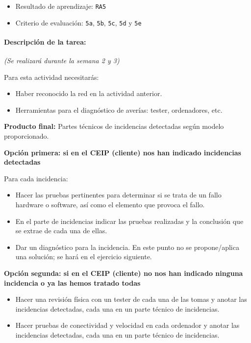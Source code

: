 \documentclass[
  spanish,
  11pt,
  paper=a4,
  ,captions=tableheading
]{scrartcl}
\providecommand{\tightlist}{%
  \setlength{\itemsep}{0pt}\setlength{\parskip}{0pt}}
\begin{document}
\begin{itemize}
\tightlist
\item
  Resultado de aprendizaje: \texttt{RA5}
\item
  Criterio de evaluación: \texttt{5a}, \texttt{5b}, \texttt{5c},
  \texttt{5d} y \texttt{5e}
\end{itemize}

\paragraph{Descripción de la tarea:}\label{descripciuxf3n-de-la-tarea-1}

\emph{(Se realizará durante la semana 2 y 3)}

Para esta actividad necesitarás:

\begin{itemize}
\tightlist
\item
  Haber reconocido la red en la actividad anterior.
\item
  Herramientas para el diagnóstico de averías: tester, ordenadores, etc.
\end{itemize}

\textbf{Producto final:} Partes técnicos de incidencias detectadas según
modelo proporcionado.

\textbf{Opción primera: si en el CEIP (cliente) nos han indicado
incidencias detectadas}

Para cada incidencia:

\begin{itemize}
\tightlist
\item
  Hacer las pruebas pertinentes para determinar si se trata de un fallo
  hardware o software, así como el elemento que provoca el fallo.
\item
  En el parte de incidencias indicar las pruebas realizadas y la
  conclusión que se extrae de cada una de ellas.
\item
  Dar un diagnóstico para la incidencia. En este punto no se
  propone/aplica una solución; se hará en el ejercicio siguiente.
\end{itemize}

\textbf{Opción segunda: si en el CEIP (cliente) no nos han indicado
ninguna incidencia o ya las hemos tratado todas}

\begin{itemize}
\tightlist
\item
  Hacer una revisión física con un tester de cada una de las tomas y
  anotar las incidencias detectadas, cada una en un parte técnico de
  incidencias.
\item
  Hacer pruebas de conectividad y velocidad en cada ordenador y anotar
  las incidencias detectadas, cada una en un parte técnico de
  incidencias.
\end{itemize}
\end{document}
